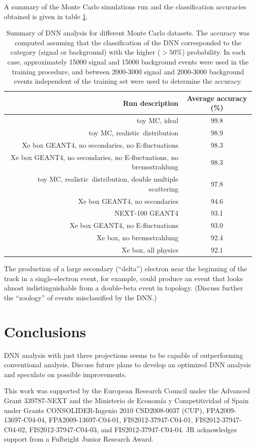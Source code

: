 \documentclass{JINST}
\begin{document}
A summary of the Monte Carlo simulations run and the classification accuracies obtained is given in table \ref{tbl.DNNsummary}.  

\begin{table}[!htb]
	\begin{center}
		\caption[DNN analysis summary]{\label{tbl.DNNsummary}Summary of DNN analysis for different Monte Carlo datasets.  The accuracy was computed assuming that the classification
			of the DNN corresponded to the category (signal or background) with the higher ($> 50$\%) probability.  In each case, approximately 15000 signal and 15000 background events were
			used in the training procedure, and between 2000-3000 signal and 2000-3000 background events independent of the training set were used to determine the accuracy.}
		\begin{tabular}{rc}
			\\
			\textbf{Run description} & \textbf{Average accuracy} (\%)\\
			\hline
			toy MC, ideal & 99.8\\
			toy MC, realistic \bbonu\,distribution & 98.9\\
			Xe box GEANT4, no secondaries, no E-fluctuations & 98.3\\
			Xe box GEANT4, no secondaries, no E-fluctuations, no bremsstrahlung & 98.3\\
			toy MC, realistic \bbonu\,distribution, double multiple scattering & 97.8\\
			Xe box GEANT4, no secondaries & 94.6\\
			NEXT-100 GEANT4 & 93.1\\
			Xe box GEANT4, no E-fluctuations & 93.0\\
			Xe box, no bremsstrahlung & 92.4\\
			Xe box, all physics & 92.1
		\end{tabular}
	\end{center}
\end{table}

The production of a large secondary (``delta'') electron near the beginning of the track in a single-electron event, for example, could produce an event that looks almost indistinguishable from 
a double-beta event in topology.  (Discuss further the ``zoology'' of events misclassified by the DNN.)

\section{Conclusions}
DNN analysis with just three projections seems to be capable of outperforming conventional analysis.  Discuss future plans to develop an optimized DNN analysis and speculate
on possible improvements.

\acknowledgments

This work was supported by the European Research Council under the Advanced Grant 339787-NEXT and the Ministerio de Econom\'{i}a y Competitividad of Spain under Grants CONSOLIDER-Ingenio 2010 CSD2008-0037 (CUP), FPA2009-13697-C04-04, FPA2009-13697-C04-01, FIS2012-37947-C04-01, FIS2012-37947-C04-02, FIS2012-37947-C04-03, and FIS2012-37947-C04-04.  JR acknowledges support from a Fulbright Junior Research Award.


\end{document}
